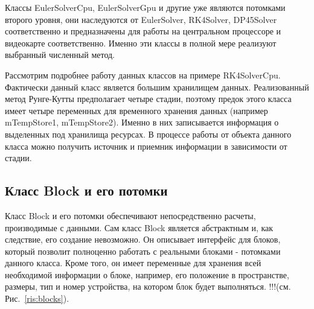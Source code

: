 \documentclass[a4paper, 14pt]{article}
\theoremstyle{definition}
\begin{document}
\par Классы EulerSolverCpu, EulerSolverGpu и другие уже являются потомками второго уровня, они наследуются от EulerSolver, RK4Solver, DP45Solver соответственно и предназначены для работы на центральном процессоре и видеокарте соответственно. Именно эти классы в полной мере реализуют выбранный численный метод.

\par Рассмотрим подробнее работу данных классов на примере RK4SolverCpu. Фактически данный класс является большим хранилищем данных. Реализованный метод Рунге-Кутты предполагает четыре стадии, поэтому предок этого класса имеет четыре переменных для временного хранения данных (например mTempStore1, mTempStore2). Именно в них записывается информация о выделенных под хранилища ресурсах. В процессе работы от объекта данного класса можно получить источник и приемник информации в зависимости от стадии.

\newpage
\subsection{Класс Block и его потомки}

\par Класс Block и его потомки обеспечивают непосредственно расчеты, производимые с данными. Сам класс Block является абстрактным и, как следствие, его создание невозможно. Он описывает интерфейс для блоков, который позволит полноценно работать с реальными блоками - потомками данного класса. Кроме того, он имеет переменные для хранения всей необходимой информации о блоке, например, его положение в пространстве, размеры, тип и номер устройства, на котором блок будет выполняться. !!!(см. Рис.~\ref{ris:blocks}).
\end{document}
